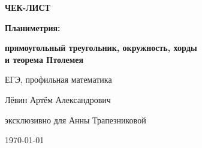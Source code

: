 \documentclass[a4paper,12pt]{article}
\begin{document}

\begin{titlepage}
\thispagestyle{empty}
\centering

\vspace*{2.5cm}

{\Large\textcolor{darkaccent}{\textbf{ЧЕК-ЛИСТ}}\par}

\vspace{0.8cm}

{\huge\bfseries Планиметрия:\par}

\vspace{0.2cm}

{\LARGE\bfseries
прямоугольный треугольник, окружность, хорды\\
и теорема Птолемея
\par}

\vspace{1.2cm}

{\large ЕГЭ, профильная математика\par}

\vfill

{\large Лёвин Артём Александрович\par}

\vspace{0.15cm}

{\large эксклюзивно для Анны Трапезниковой\par}

\vspace{0.6cm}

{\large \today\par}

\vspace{1.6cm}


\vspace*{0.8cm}

\end{titlepage}

\end{document}
